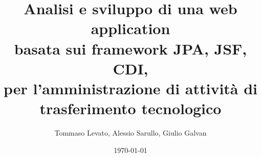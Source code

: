 \documentclass[xcolor=dvipsnames,10pt]{beamer}
\title[Analisi e sviluppo di una web application]{Analisi e sviluppo di una web application \\
basata sui framework JPA, JSF, CDI, \\
per l'amministrazione di attività di trasferimento tecnologico\\}
\author{Tommaso Levato, Alessio Sarullo, Giulio Galvan}
\date{\today}
\begin{document}
\frame{\titlepage}




\section*{}

\end{document}
